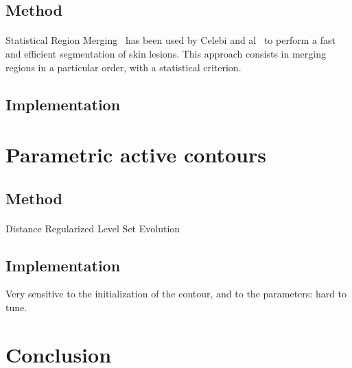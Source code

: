 \documentclass[a4paper,10pt]{article}
\begin{document}
\subsection{Method}
\paragraph{} Statistical Region Merging~\cite{nock_statistical_2004} has been 
used by Celebi and al~\cite{celebi_border_2008} to perform a fast and efficient 
segmentation of skin lesions. This approach consists in merging regions in a particular order, with a statistical criterion.
\subsection{Implementation}

\section{Parametric active contours}
\subsection{Method}
\paragraph{}  Distance Regularized Level Set Evolution \cite{li2010distance} 
\subsection{Implementation}
Very sensitive to the initialization of the contour, and to the parameters: hard to tune.

\section*{Conclusion}





\end{document}
